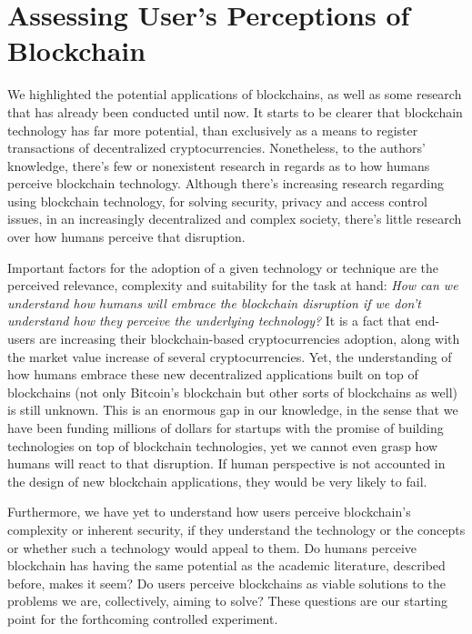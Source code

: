 
\chapter{Assessing User's Perceptions of Blockchain}

We highlighted the potential applications of blockchains, as well as some research that has already been conducted until now. It starts to be clearer that blockchain technology has far more potential, than exclusively as a means to register transactions of decentralized cryptocurrencies. Nonetheless, to the authors' knowledge, there's few or nonexistent research in regards as to how humans perceive blockchain technology. Although there's increasing research regarding using blockchain technology, for solving security, privacy and access control issues, in an increasingly decentralized and complex society, there's little research over how humans perceive that disruption.
  
Important factors for the adoption of a given technology or technique are the perceived relevance, complexity and suitability for the task at hand: \emph{How can we understand how humans will embrace the blockchain disruption if we don't understand how they perceive the underlying technology?} It is a fact that end-users are increasing their blockchain-based cryptocurrencies adoption, along with the market value increase of several cryptocurrencies. Yet, the understanding of how humans embrace these new decentralized applications built on top of blockchains (not only Bitcoin's blockchain but other sorts of blockchains as well) is still unknown. This is an enormous gap in our knowledge, in the sense that we have been funding millions of dollars for startups with the promise of building technologies on top of blockchain technologies, yet we cannot even grasp how humans will react to that disruption. If human perspective is not accounted in the design of new blockchain applications, they would be very likely to fail.

Furthermore, we have yet to understand how users perceive blockchain's complexity or inherent security, if they understand the technology or the concepts or whether such a technology would appeal to them. Do humans perceive blockchain has having the same potential as the academic literature, described before, makes it seem? Do users perceive blockchains as viable solutions to the problems we are, collectively, aiming to solve? These questions are our starting point for the forthcoming controlled experiment.

